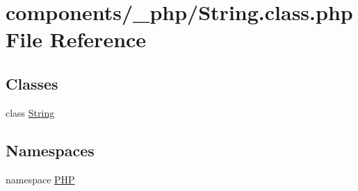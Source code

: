 \hypertarget{_string_8class_8php}{
\section{components/\_\-php/String.class.php File Reference}
\label{_string_8class_8php}
}
\subsection*{Classes}
\begin{CompactItemize}
\item 
class \hyperlink{class_string}{String}
\end{CompactItemize}
\subsection*{Namespaces}
\begin{CompactItemize}
\item 
namespace \hyperlink{namespace_p_h_p}{PHP}
\end{CompactItemize}
